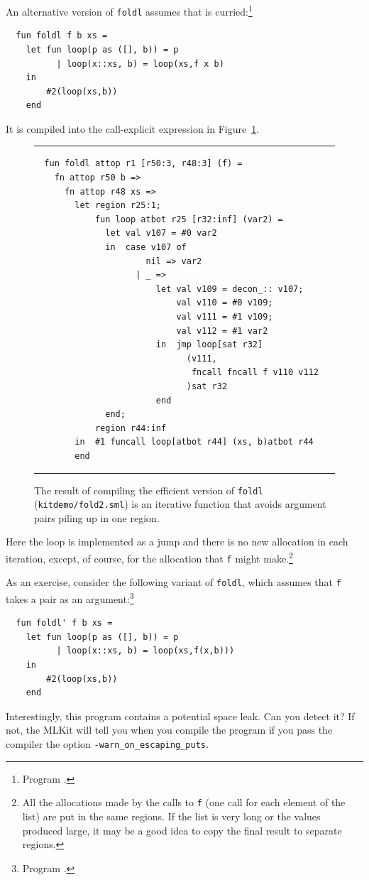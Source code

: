 \documentclass[12pt]{book}
\begin{document}
An alternative version of {\tt foldl} assumes that 
is curried:\footnote{Program .}
\begin{verbatim}
  fun foldl f b xs =
    let fun loop(p as ([], b)) = p
          | loop(x::xs, b) = loop(xs,f x b)
    in
        #2(loop(xs,b))
    end
\end{verbatim}
It is compiled into the call-explicit expression in
Figure~\ref{fold2.fig}.
\begin{figure}
\hrule \medskip
\begin{verbatim}
  fun foldl attop r1 [r50:3, r48:3] (f) =
    fn attop r50 b =>
      fn attop r48 xs =>
        let region r25:1;
            fun loop atbot r25 [r32:inf] (var2) =
              let val v107 = #0 var2
              in  case v107 of
                      nil => var2
                    | _ =>
                        let val v109 = decon_:: v107;
                            val v110 = #0 v109;
                            val v111 = #1 v109;
                            val v112 = #1 var2
                        in  jmp loop[sat r32]
                              (v111,
                               fncall fncall f v110 v112
                              )sat r32
                        end
              end;
            region r44:inf
        in  #1 funcall loop[atbot r44] (xs, b)atbot r44
        end
\end{verbatim}
\caption{The result of compiling the efficient version of {\tt foldl}
  ({\tt kitdemo/fold2.sml}) is an iterative function that avoids
  argument pairs piling up in one region.}  \medskip \hrule
\label{fold2.fig}
\end{figure}
Here the loop is implemented as a jump and there is no new allocation
in each iteration, except, of course, for the allocation that {\tt f}
might make.\footnote{All the allocations made by the calls to {\tt f}
  (one call for each element of the list) are put in the same regions.
  If the list is very long or the values produced large, it may be a
  good idea to copy the final result to separate regions.}

As an exercise, consider the following variant of {\tt foldl}, which
assumes that {\tt f} takes a pair as an argument:\footnote{Program
  .}
\begin{verbatim}
  fun foldl' f b xs =
    let fun loop(p as ([], b)) = p
          | loop(x::xs, b) = loop(xs,f(x,b)))
    in
        #2(loop(xs,b))
    end
\end{verbatim}
Interestingly, this program contains a potential space leak. Can you
detect it? If not, the MLKit will tell you when you compile the
program if you pass the compiler the option
\texttt{-warn\_on\_escaping\_puts}.
\end{document}
